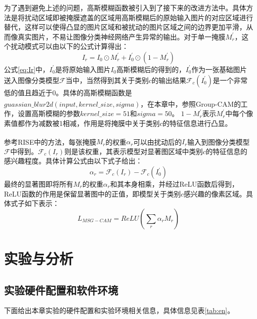为了遇到避免上述的问题，高斯模糊函数被引入到了接下来的改进方法中。具体方法是将扰动区域即被掩膜遮盖的区域用高斯模糊后的原始输入图片的对应区域进行替代，这样可以使得凸显的图片区域和被扰动的图片区域之间的边界更加平滑，从而像真实图片，不易让图像分类神经网络产生异常的输出。对于单一掩膜$M^{\prime}_r$，这个扰动模式可以由以下的公式计算得出：
\begin{equation}
	I_r=I_0\odot M^{\prime}_r+I^{\prime}_0\odot (1-M^{\prime}_r)
	\label{eq:Ir}
\end{equation}
公式\ref{eq:Ir}中，$I^{\prime}_0$是将原始输入图片$I_0$高斯模糊后的得到的，$I^{\prime}_0$作为一张基础图片送入图像分类模型$\mathcal{F}$当中，当然得到其关于类别$c$的输出结果$\mathcal{F}_c(I^{\prime}_0)$是一个非常低的值且趋近于0。具体的高斯模糊函数是$guassian\_blur2d(input,kernel\_size,sigma)$，在本章中，参照Group-CAM\textsuperscript{\cite{zhang2021novel}}的工作，设置高斯模糊的参数$kernel\_size=51$和$sigma=50$。 $1-M^{\prime}_r$表示$M^{\prime}_r$中每个像素值都作为减数被1相减，作用是将掩膜中关于类别$c$的特征信息进行凸显。

参考RISE\textsuperscript{\cite{petsiuk2018rise}}中的方法，每张掩膜$M_r$的权重$\alpha_r$可以由扰动后的$I_r$输入到图像分类模型$\mathcal{F}$中得到。$\mathcal{F}_c(I_r)$则是该权重，其表示模型对显著图区域中类别$c$的特征信息的感兴趣程度。具体计算公式由以下式子给出：
\begin{equation}
	\alpha_r=\mathcal{F}_c(I_r)-\mathcal{F}_c(I^{\prime}_0)
\end{equation}
最终的显著图即将所有$M_r$的权重$\alpha_r$和其本身相乘，并经过ReLU函数后得到，ReLU函数的作用是保留显著图中的正值，即模型关于类别$c$感兴趣的像素区域。具体式子如下表示：
\begin{equation}
	L_{MSG-CAM}=ReLU(\sum_{r}\alpha_r M_r)
\end{equation}
 

 
 
\section{实验与分析}

\subsection{实验硬件配置和软件环境}
下面给出本章实验的硬件配置和实验环境相关信息，具体信息见表\ref{tab:en}。

